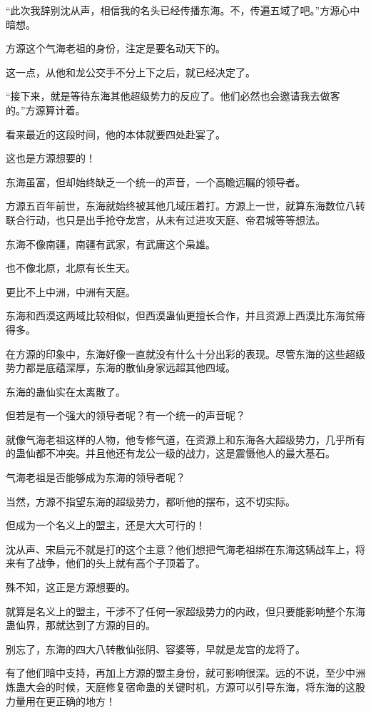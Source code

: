 \begin{this_body}
“此次我辞别沈从声，相信我的名头已经传播东海。不，传遍五域了吧。”方源心中暗想。

方源这个气海老祖的身份，注定是要名动天下的。

这一点，从他和龙公交手不分上下之后，就已经决定了。

“接下来，就是等待东海其他超级势力的反应了。他们必然也会邀请我去做客的。”方源算计着。

看来最近的这段时间，他的本体就要四处赴宴了。

这也是方源想要的！

东海虽富，但却始终缺乏一个统一的声音，一个高瞻远瞩的领导者。

方源五百年前世，东海就始终被其他几域压着打。方源上一世，就算东海数位八转联合行动，也只是出手抢夺龙宫，从未有过进攻天庭、帝君城等等想法。

东海不像南疆，南疆有武家，有武庸这个枭雄。

也不像北原，北原有长生天。

更比不上中洲，中洲有天庭。

东海和西漠这两域比较相似，但西漠蛊仙更擅长合作，并且资源上西漠比东海贫瘠得多。

在方源的印象中，东海好像一直就没有什么十分出彩的表现。尽管东海的这些超级势力都是底蕴深厚，东海的散仙身家远超其他四域。

东海的蛊仙实在太离散了。

但若是有一个强大的领导者呢？有一个统一的声音呢？

就像气海老祖这样的人物，他专修气道，在资源上和东海各大超级势力，几乎所有的蛊仙都不冲突。并且他还有龙公一级的战力，这是震慑他人的最大基石。

气海老祖是否能够成为东海的领导者呢？

当然，方源不指望东海的超级势力，都听他的摆布，这不切实际。

但成为一个名义上的盟主，还是大大可行的！

沈从声、宋启元不就是打的这个主意？他们想把气海老祖绑在东海这辆战车上，将来有了战争，他们的头上就有高个子顶着了。

殊不知，这正是方源想要的。

就算是名义上的盟主，干涉不了任何一家超级势力的内政，但只要能影响整个东海蛊仙界，那就达到了方源的目的。

别忘了，东海的四大八转散仙张阴、容婆等，早就是龙宫的龙将了。

有了他们暗中支持，再加上方源的盟主身份，就可影响很深。远的不说，至少中洲炼蛊大会的时候，天庭修复宿命蛊的关键时机，方源可以引导东海，将东海的这股力量用在更正确的地方！


\end{this_body}
